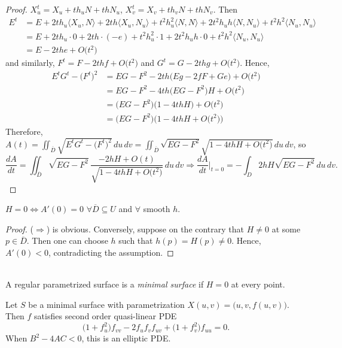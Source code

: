\begin{proof}
$X_u^t = X_u + th_uN + thN_u$, $X_v^t = X_v + th_vN + thN_v$. Then
\begin{align*}
    E^t &= E + 2th_u\big\langle X_u, N\big\rangle + 2th\big\langle X_u, N_u\big\rangle + t^2h_u^2\langle N, N\rangle + 2t^2h_uh\big\langle N, N_u\big\rangle + t^2h^2\big\langle N_u, N_u\big\rangle\\
    &= E + 2th_u\cdot 0 + 2th\cdot(-e) + t^2h_u^2\cdot 1 + 2t^2h_uh\cdot 0 + t^2h^2\big\langle N_u, N_u\big\rangle\\
    &= E - 2the + O\big(t^2\big)
\end{align*}
and similarly, $F^t = F - 2thf + O\big(t^2\big)$ and $G^t = G - 2thg + O\big(t^2\big)$. Hence,
\begin{align*}
    E^tG^t - \big(F^t\big)^2 &= EG - F^2 - 2th\big(Eg - 2fF + Ge\big) + O\big(t^2\big)\\
    &= EG - F^2 - 4th\big(EG - F^2\big)H + O\big(t^2\big)\\
    &= \big(EG - F^2\big)\big(1 - 4thH\big) + O\big(t^2\big)\\
    &= \big(EG - F^2\big)\big(1 - 4thH + O\big(t^2\big)\big)
\end{align*}
Therefore, $A(t) = \iint_{\overline{D}}\sqrt{E^tG^t - \big(F^t\big)^2}\,du\,dv = \iint_{\overline{D}}\sqrt{EG - F^2}\sqrt{1 - 4thH + O\big(t^2\big)}\,du\,dv$, so
\[
\frac{dA}{dt} = \iint_{\overline{D}}\sqrt{EG - F^2}\,\frac{-2hH + O(t)}{\sqrt{1 - 4thH + O\big(t^2\big)}}\,du\,dv \Rightarrow \frac{dA}{dt}\Bigg|_{t = 0} = -\int_D 2hH\sqrt{EG - F^2}\,du\,dv.
\]
\end{proof}

\begin{corollary}
$H = 0 \iff A'(0) = 0$ $\forall\overline{D}\subseteq U$ and $\forall$ smooth $h$.
\end{corollary}

\begin{proof}
($\Rightarrow$) is obvious. Conversely, suppose on the contrary that $H\neq 0$ at some $p\in\overline{D}$. Then one can choose $h$ such that $h(p) = H(p)\neq 0$. Hence, $A'(0) < 0$, contradicting the assumption.
\end{proof}

\\
A regular parametrized surface is a \textit{minimal surface} if $H = 0$ at every point.

\begin{theorem}
Let $S$ be a minimal surface with parametrization $X(u, v) = \big(u, v, f(u, v)\big)$. Then $f$ satisfies second order quasi-linear PDE
\[
\big(1 + f_u^2\big)f_{vv} - 2f_uf_vf_{uv} + \big(1 + f_v^2\big)f_{uu} = 0.
\]
When $B^2 - 4AC < 0$, this is an elliptic PDE.
\end{theorem}

